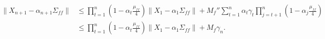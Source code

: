 \begin{align*}
    \lVert X_{n+1} - \alpha_{n+1} \Sigma_{ff} \rVert 
    & \leq 
    \prod_{t=1}^n \left(1 - \alpha_t \frac{\mu_{ff}}{4}\right) \lVert X_1 - \alpha_1 \Sigma_{ff}\rVert 
    + M_f'' \sum_{t=1}^n \alpha_t \gamma_t \prod_{j=t+1}^n \left(1 - \alpha_j \frac{\mu_{ff}}{4}\right) 
    \\
    & \leq 
    \prod_{t=1}^n \left(1 - \alpha_t \frac{\mu_{ff}}{4}\right) \lVert X_1 - \alpha_1 \Sigma_{ff} \rVert + M_f \gamma_{n}
    .
\end{align*}



